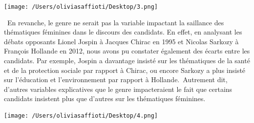 \documentclass[
  letterpaper,
  DIV=11,
  numbers=noendperiod]{scrartcl}
\begin{document}
\texttt{[image: /Users/oliviasaffioti/Desktop/3.png]}

~En revanche, le genre ne serait pas la variable impactant la saillance
des thématiques féminines dans le discours des candidats. En effet, en
analysant les débats opposants Lionel Jospin à Jacques Chirac en 1995 et
Nicolas Sarkozy à François Hollande en 2012, nous avons pu constater
également des écarts entre les candidats. Par exemple, Jospin a
davantage insisté sur les thématiques de la santé et de la protection
sociale par rapport à Chirac, ou encore Sarkozy a plus insisté sur
l'éducation et l'environnement par rapport à Hollande.~Autrement dit,
d'autres variables explicatives que le genre impacteraient le fait que
certains candidats insistent plus que d'autres sur les thématiques
féminines.~

\texttt{[image: /Users/oliviasaffioti/Desktop/4.png]}
\end{document}
